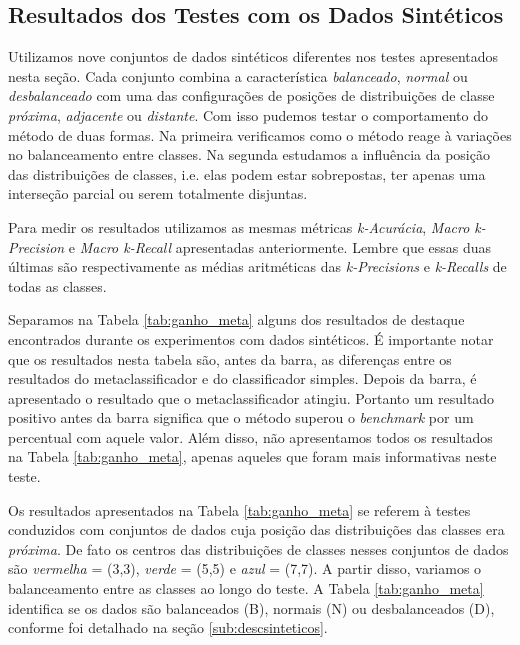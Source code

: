 \newpage
\subsection{Resultados dos Testes com os Dados Sintéticos}

Utilizamos nove conjuntos de dados sintéticos diferentes nos testes apresentados nesta seção.
Cada conjunto combina a característica \textit{balanceado}, \textit{normal} ou \textit{ desbalanceado} com uma das configurações de posições de distribuições de classe \textit{próxima}, \textit{adjacente} ou \textit{distante}.
Com isso pudemos testar o comportamento do método de duas formas.
Na primeira verificamos como o método reage à variações no balanceamento entre classes.
Na segunda estudamos a influência da posição das distribuições de classes, i.e. elas podem estar sobrepostas, ter apenas uma interseção parcial ou serem totalmente disjuntas.

Para medir os resultados utilizamos as mesmas métricas \textit{k-Acurácia}, \textit{Macro k-Precision} e \textit{Macro k-Recall} apresentadas anteriormente.
Lembre que essas duas últimas são respectivamente as médias aritméticas das \textit{k-Precisions} e \textit{k-Recalls} de todas as classes.

Separamos na Tabela \ref{tab:ganho_meta} alguns dos resultados de destaque encontrados durante os experimentos com dados sintéticos.
É importante notar que os resultados nesta tabela são, antes da barra, as diferenças entre os resultados do metaclassificador e do classificador simples.
Depois da barra, é apresentado o resultado que o metaclassificador atingiu.
Portanto um resultado positivo antes da barra significa que o método superou o \textit{benchmark} por um percentual com aquele valor.
Além disso, não apresentamos todos os resultados na Tabela \ref{tab:ganho_meta}, apenas aqueles que foram mais informativas neste teste.

Os resultados apresentados na Tabela \ref{tab:ganho_meta} se referem à testes conduzidos com conjuntos de dados cuja posição das distribuições das classes era \textit{próxima}.
De fato os centros das distribuições de classes nesses conjuntos de dados são \textit{vermelha} = (3,3), \textit{verde} = (5,5) e \textit{azul} = (7,7).
A partir disso, variamos o balanceamento entre as classes ao longo do teste.
A Tabela \ref{tab:ganho_meta} identifica se os dados são balanceados (B), normais (N) ou desbalanceados (D), conforme foi detalhado na seção \ref{sub:descsinteticos}.

